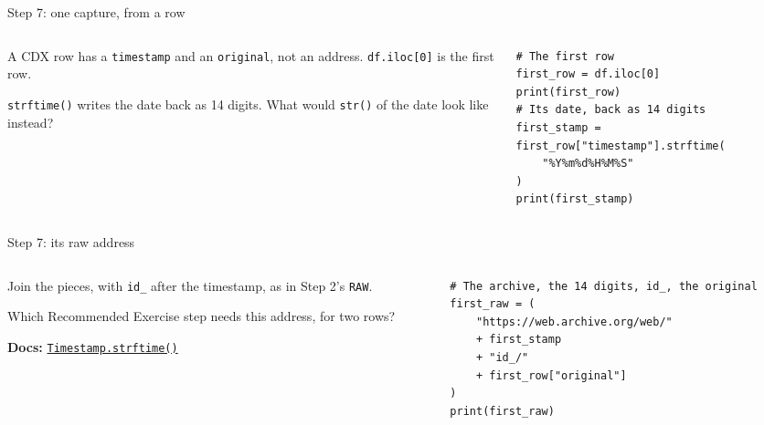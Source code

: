 \documentclass[9pt,aspectratio=169]{beamer}
\begin{document}
\begin{frame}[fragile]{Step 7: one capture, from a row}
    \begin{columns}[T]
        \begin{column}{0.37\textwidth}
            A CDX row has a \texttt{timestamp} and an \texttt{original}, not an address. \texttt{df.iloc[0]} is the first row.

            \medskip
            \texttt{strftime()} writes the date back as 14 digits. What would \texttt{str()} of the date look like instead?
        \end{column}
        \begin{column}{0.6\textwidth}
\begin{lstlisting}
# The first row
first_row = df.iloc[0]
print(first_row)
# Its date, back as 14 digits
first_stamp = first_row["timestamp"].strftime(
    "%Y%m%d%H%M%S"
)
print(first_stamp)
\end{lstlisting}
        \end{column}
    \end{columns}
\end{frame}

\begin{frame}[fragile]{Step 7: its raw address}
    \begin{columns}[T]
        \begin{column}{0.37\textwidth}
            Join the pieces, with \texttt{id\_} after the timestamp, as in Step 2's \texttt{RAW}.

            \medskip
            Which Recommended Exercise step needs this address, for two rows?

            \medskip
            {\scriptsize\textbf{Docs:} \href{https://pandas.pydata.org/docs/reference/api/pandas.Timestamp.strftime.html}{\texttt{Timestamp.strftime()}}\par}
        \end{column}
        \begin{column}{0.6\textwidth}
\begin{lstlisting}
# The archive, the 14 digits, id_, the original
first_raw = (
    "https://web.archive.org/web/"
    + first_stamp
    + "id_/"
    + first_row["original"]
)
print(first_raw)
\end{lstlisting}
        \end{column}
    \end{columns}
\end{frame}
\end{document}
